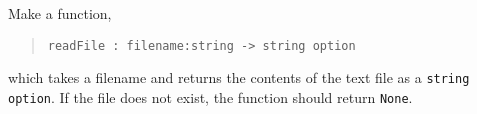 \label{cat:readFile}
Make a function,
\begin{quote}
  \mbox{\lstinline!readFile : filename:string -> string option!}
\end{quote}
which takes a filename and returns the contents of the text file as a
\lstinline{string option}. If the file does not exist, the function
should return \lstinline{None}.
